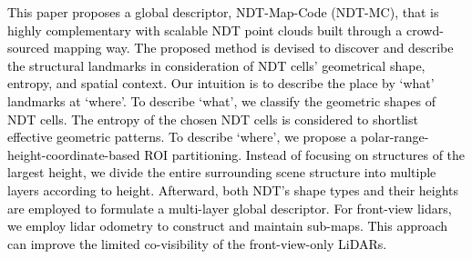 \documentclass[letterpaper, 10 pt, conference]{ieeeconf}   %
\newcommand\kevin[1]{\textcolor{black}{#1}}
\begin{document}
\kevin{This paper proposes a global descriptor, NDT-Map-Code (NDT-MC), that is highly complementary with scalable NDT point clouds built through a crowd-sourced mapping way.  The proposed method is devised to discover and describe the structural landmarks in consideration of NDT cells' geometrical shape, entropy, and spatial context.  Our intuition is to describe the place by `what' landmarks at `where'. To describe `what', we classify the geometric shapes of NDT cells. The entropy of the chosen NDT cells is considered to shortlist effective geometric patterns. To describe `where', we propose a polar-range-height-coordinate-based ROI partitioning. Instead of focusing on structures of the largest height, we divide the entire surrounding scene structure into multiple layers according to height. Afterward, both NDT's shape types and their heights are employed to formulate a multi-layer global descriptor. For front-view lidars, we employ lidar odometry to construct and maintain sub-maps. This approach can improve the limited co-visibility of the front-view-only LiDARs.}

\end{document}

